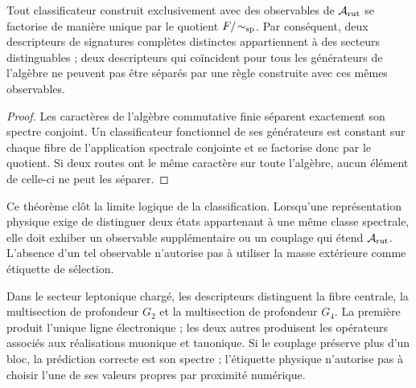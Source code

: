 \begin{theorem}
Tout classificateur construit exclusivement avec des observables de
\(\mathcal A_{\rm rut}\) se factorise de manière unique par le quotient
\(F/\!\sim_{\rm sp}\). Par conséquent, deux descripteurs de signatures complètes
distinctes appartiennent à des secteurs distinguables ; deux descripteurs qui coïncident
pour tous les générateurs de l'algèbre ne peuvent pas être séparés par une règle
construite avec ces mêmes observables.
\end{theorem}

\begin{proof}
Les caractères de l'algèbre commutative finie séparent exactement son
spectre conjoint. Un classificateur fonctionnel de ses générateurs est constant
sur chaque fibre de l'application spectrale conjointe et se factorise donc par le
quotient. Si deux routes ont le même caractère sur toute l'algèbre, aucun
élément de celle-ci ne peut les séparer.
\end{proof}

Ce théorème clôt la limite logique de la classification. Lorsqu'une
représentation physique exige de distinguer deux états appartenant à une même
classe spectrale, elle doit exhiber un observable supplémentaire ou un couplage qui
étend \(\mathcal A_{\rm rut}\). L'absence d'un tel observable n'autorise pas à
utiliser la masse extérieure comme étiquette de sélection.

Dans le secteur leptonique chargé, les descripteurs distinguent la fibre centrale,
la multisection de profondeur \(G_2\) et la multisection de profondeur
\(G_4\). La première produit l'unique ligne électronique ; les deux autres
produisent les opérateurs associés aux réalisations muonique et tauonique. Si
le couplage préserve plus d'un bloc, la prédiction correcte est son
spectre ; l'étiquette physique n'autorise pas à choisir l'une de ses valeurs propres par
proximité numérique.


